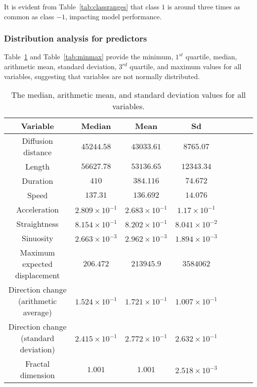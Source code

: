 \let\LaTeXcline\cline\documentclass[sn-mathphys-num]{sn-jnl}\let\cline\LaTeXcline
\begin{document}
It is evident from Table~\ref{tab:classranges} that class $1$ is around three times as common as class $-1$, impacting model performance.

\subsubsection{Distribution analysis for predictors}

Table~\ref{tab:avgsd} and Table~\ref{tab:minmax} provide the minimum, $1^{st}$ quartile, median, arithmetic mean, standard deviation, $3^{rd}$ quartile, and maximum values for all variables, suggesting that variables are not normally distributed.

\begin{table}[!ht]
    \centering
    \caption{The median, arithmetic mean, and standard deviation values for all variables.}
    \label{tab:avgsd}
        \begin{tabular}{|c|c|c|c|c|c|c|c|}
            \hline
            Variable & Median & Mean & Sd \\ \hline
            Diffusion distance & $45244.58$ & $43033.61$ & $8765.07$ \\ \hline
            Length & $56627.78$ & $53136.65$ & $12343.34$ \\ \hline
            Duration & $410$ & $384.116$ & $74.672$ \\ \hline
            Speed & $137.31$ & $136.692$ & $14.076$ \\ \hline
            Acceleration & $2.809 \times 10^{-1}$ & $2.683 \times 10^{-1}$ & $1.17 \times 10^{-1}$ \\ \hline
            Straightness & $8.154 \times 10^{-1}$ & $8.202 \times 10^{-1}$ & $8.041 \times 10^{-2}$ \\ \hline
            Sinuosity & $2.663 \times 10^{-3}$ & $2.962 \times 10^{-3}$ & $1.894 \times 10^{-3}$ \\ \hline
            Maximum expected displacement & $206.472$ & $213945.9$ & $3584062$ \\ \hline
            Direction change (arithmetic average) & $1.524 \times 10^{-1}$ & $1.721 \times 10^{-1}$ & $1.007 \times 10^{-1}$ \\ \hline   
            Direction change (standard deviation) & $2.415 \times 10^{-1}$ & $2.772 \times 10^{-1}$ & $2.632 \times 10^{-1}$ \\ \hline   
            Fractal dimension & $1.001$ & $1.001$ & $2.518 \times 10^{-3}$ \\ \hline

\end{tabular}
\end{table}
\end{document}
